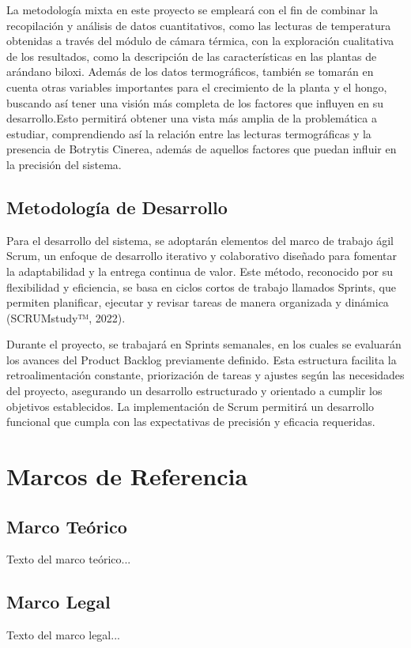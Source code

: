 \bigskip
La metodología mixta en este proyecto se empleará con el fin de combinar la recopilación y análisis de datos cuantitativos, como las lecturas de temperatura obtenidas a través del módulo de cámara térmica, con la exploración cualitativa de los resultados, como la descripción de las características en las plantas de arándano biloxi. Además de los datos termográficos, también se tomarán en cuenta otras variables importantes para el crecimiento de la planta y el hongo, buscando así tener una visión más completa de los factores que influyen en su desarrollo.Esto permitirá obtener una vista más amplia de la problemática a estudiar, comprendiendo así la relación entre las lecturas termográficas y la presencia de Botrytis Cinerea, además de aquellos factores que puedan influir en la precisión del sistema.


\subsection{Metodología de Desarrollo}
Para el desarrollo del sistema, se adoptarán elementos del marco de trabajo ágil Scrum, un enfoque de desarrollo iterativo y colaborativo diseñado para fomentar la adaptabilidad y la entrega continua de valor. Este método, reconocido por su flexibilidad y eficiencia, se basa en ciclos cortos de trabajo llamados Sprints, que permiten planificar, ejecutar y revisar tareas de manera organizada y dinámica (SCRUMstudy™, 2022).

\bigskip
Durante el proyecto, se trabajará en Sprints semanales, en los cuales se evaluarán los avances del Product Backlog previamente definido. Esta estructura facilita la retroalimentación constante, priorización de tareas y ajustes según las necesidades del proyecto, asegurando un desarrollo estructurado y orientado a cumplir los objetivos establecidos. La implementación de Scrum permitirá un desarrollo funcional que cumpla con las expectativas de precisión y eficacia requeridas.

\section{Marcos de Referencia}
\subsection{Marco Teórico}
Texto del marco teórico...

\subsection{Marco Legal}
Texto del marco legal...